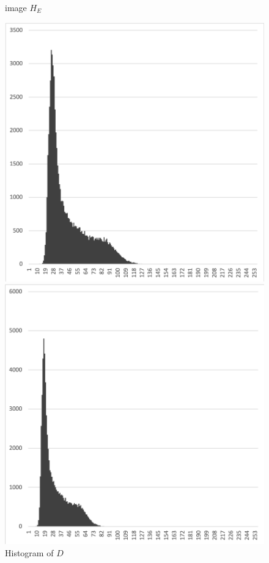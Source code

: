 \documentclass[12pt,a4paper,notitlepage,oneside,amsmath,amssymb]{article}
\begin{document}
\begin{CJK*}{UTF8}{bkai}
\begin{enumerate}[label=(\alph*)]
\begin{figure}[hbt!]
\begin{minipage}{.25\textwidth}
              \caption*{image \(H_E\)}
            \end{minipage}
            \begin{minipage}{.25\textwidth}
              \centering
              \includegraphics[width=.95\linewidth]{hist_D}
              \caption*{Histogram of \(D\)}
            \end{minipage}%
            \begin{minipage}{.25\textwidth}
              \centering
              \includegraphics[width=.95\linewidth]{hist_E}

\end{minipage}
\end{figure}
\end{enumerate}
\end{CJK*}
\end{document}
